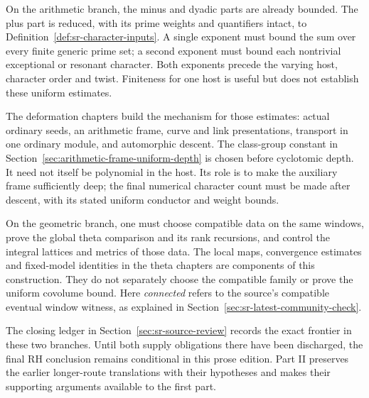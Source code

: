 On the arithmetic branch, the minus and dyadic parts are
already bounded. The plus part is reduced, with its prime
weights and quantifiers intact, to
Definition~\ref{def:sr-character-inputs}. A single exponent
must bound the sum over every finite generic prime set;
a second exponent must bound each nontrivial exceptional
or resonant character. Both exponents precede the varying
host, character order and twist.
Finiteness for one host is useful but does not establish
these uniform estimates.

The deformation chapters build the mechanism for those
estimates: actual ordinary seeds, an arithmetic frame,
curve and link presentations, transport in one ordinary
module, and automorphic descent. The class-group constant
in Section~\ref{sec:arithmetic-frame-uniform-depth} is
chosen before cyclotomic depth. It need not itself be
polynomial in the host. Its role is to make the auxiliary
frame sufficiently deep; the final numerical character
count must be made after descent, with its stated uniform
conductor and weight bounds.

On the geometric branch, one must choose compatible data
on the same windows, prove the global theta comparison
and its rank recursions, and control the integral lattices
and metrics of those data. The local maps, convergence
estimates and fixed-model identities in the theta chapters
are components of this construction. They do not separately
choose the compatible family or prove the uniform
covolume bound. Here \emph{connected} refers to the
source's compatible eventual window witness, as explained
in Section~\ref{sec:sr-latest-community-check}.

The closing ledger in Section~\ref{sec:sr-source-review}
records the exact frontier in these two branches.
Until both supply obligations there have been discharged,
the final RH conclusion remains conditional in this prose
edition. Part II preserves the earlier longer-route
translations with their hypotheses and makes their
supporting arguments available to the first part.
